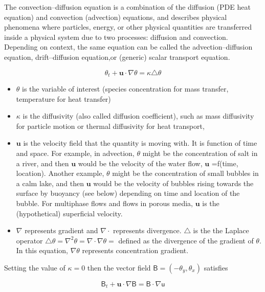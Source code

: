 \documentclass[a4paper]{article}
\begin{document}
The convection–diffusion equation is a combination of the diffusion (PDE heat equation) and convection (advection) equations, and describes physical phenomena where particles, energy, or other physical quantities are transferred inside 
a physical system due to two processes: diffusion and convection. Depending on context, the same equation can be called the advection–diffusion equation, drift–diffusion equation,or (generic) scalar transport equation.

\begin{equation}
\theta_{t} + \mathbf{u} \cdot \nabla \theta = \kappa \triangle \theta
\end{equation}

\begin{itemize}
 \item $\theta$  is the variable of interest (species concentration for mass transfer, temperature for heat transfer)
 \item $\kappa$ is the diffusivity (also called diffusion coefficient), such as mass diffusivity for particle motion or thermal diffusivity for heat transport,
 \item $\mathbf{u}$  is the velocity field that the quantity is moving with. It is function of time and space. For example, in advection, $\theta$ might be the concentration of salt in a river, and then $\mathbf{u}$ would be the velocity of the water flow, $\mathbf{u}$ =f(time, location). Another example, $\theta$ might be the concentration of small bubbles in a calm lake, and then $\mathbf{u}$ would be the velocity of bubbles rising towards the surface by buoyancy (see below) depending on time and location of the bubble. For multiphase flows and flows in porous media, $\mathbf{u}$ is the (hypothetical) superficial velocity.
 \item $\nabla$  represents gradient and $\nabla \cdot$ represents divergence. $\triangle$ is the the Laplace operator $\triangle \theta = \nabla^{2} \theta = \nabla \cdot \nabla \theta = $ defined as the divergence of the gradient of $\theta$. In this equation, $\nabla \theta$ represents concentration gradient.
\end{itemize}

Setting the value of $\kappa = 0$ then the vector field $\mathsf{B} = (-\theta_{y}, \theta_{x})$ satisfies 

\begin{equation}
\mathsf{B}_{t} + \mathbf{u} \cdot \nabla \mathsf{B} = \mathsf{B} \cdot \nabla \mathsf{u}
\end{equation}
\end{document}
